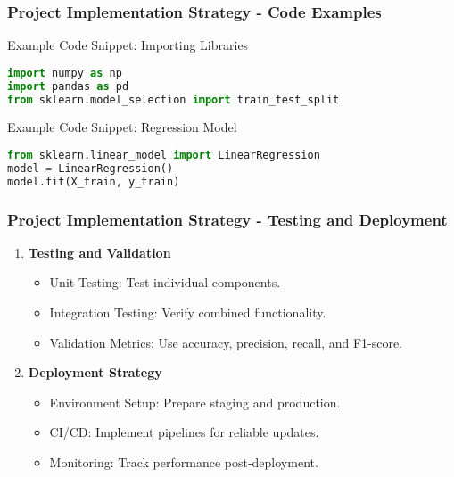 \documentclass[aspectratio=169]{beamer}
\begin{document}
\begin{frame}[fragile]
    \frametitle{Project Implementation Strategy - Code Examples}
    \begin{block}{Example Code Snippet: Importing Libraries}
        \begin{lstlisting}[language=Python]
import numpy as np
import pandas as pd
from sklearn.model_selection import train_test_split
        \end{lstlisting}
    \end{block}
    
    \begin{block}{Example Code Snippet: Regression Model}
        \begin{lstlisting}[language=Python]
from sklearn.linear_model import LinearRegression
model = LinearRegression()
model.fit(X_train, y_train)
        \end{lstlisting}
    \end{block}
\end{frame}

\begin{frame}[fragile]
    \frametitle{Project Implementation Strategy - Testing and Deployment}
    \begin{enumerate}
        \item \textbf{Testing and Validation}
            \begin{itemize}
                \item Unit Testing: Test individual components.
                \item Integration Testing: Verify combined functionality.
                \item Validation Metrics: Use accuracy, precision, recall, and F1-score.
            \end{itemize}
        \item \textbf{Deployment Strategy}
            \begin{itemize}
                \item Environment Setup: Prepare staging and production.
                \item CI/CD: Implement pipelines for reliable updates.
                \item Monitoring: Track performance post-deployment.
            \end{itemize}
    \end{enumerate}
\end{frame}
\end{document}
